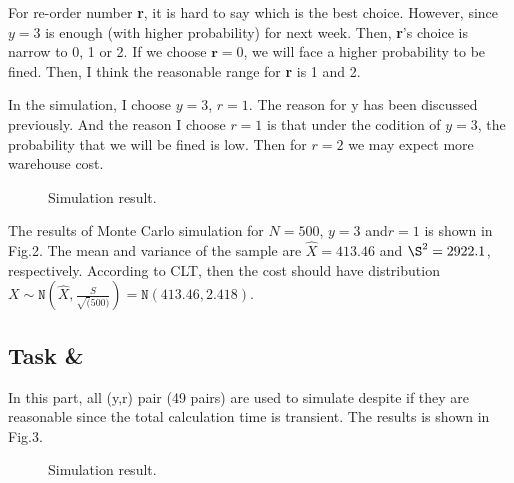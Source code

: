 \documentclass[letterpaper, 10 pt, conference]{ieeeconf}
\begin{document}
For re-order number \textbf{r}, it is hard to say which is the best choice. However, since $y=3$ is enough (with higher probability) for next week. Then, \textbf{r}'s choice is narrow to 0, 1 or 2. If we choose $\textbf{r}=0$, we will face a higher probability to be fined. Then, I think the reasonable range for \textbf{r} is 1 and 2.


In the simulation, I choose $y = 3$, $r = 1$. The reason for y has been discussed previously. And the reason I choose $r=1$ is that under the codition of $y = 3$, the probability that we will be fined is low. Then for $r=2$ we may expect more warehouse cost.
\begin{figure}[thpb]
   \centering
   \caption{Simulation result.}
\end{figure}


The results of Monte Carlo simulation for $N=500$, $y = 3$ and$r = 1$ is shown in Fig.2. The mean and variance of the sample are $\hat{X} = 413.46$ and $\S^2 =2922.1$, respectively. According to CLT, then the cost should have distribution $X \sim  \mathtt{N}(\hat{X},\frac{S}{\sqrt(500)})=\mathtt{N}(413.46,2.418)$.


\subsection{Task \uppercase\expandafter{} \& \uppercase\expandafter{}}
In this part, all (y,r) pair (49 pairs) are used to simulate despite if they are reasonable since the total calculation time is transient. The results is shown in Fig.3.
\begin{figure}[thpb]
   \centering
   \caption{Simulation result.}
\end{figure}
\end{document}
